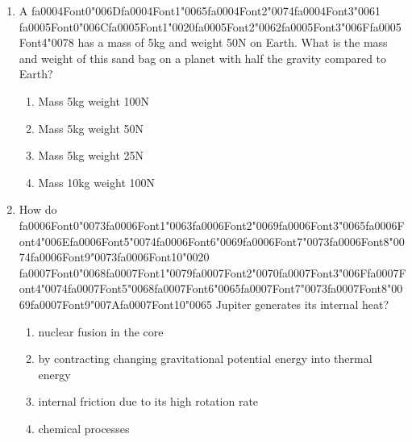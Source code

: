 \documentclass[12pt]{article}
\begin{document}
\begin{enumerate}[label=\arabic*.]
\begin{enumerate}[label=(\alph*)]
    \item Power emitted is 1/16 times as high; peak emission wavelength is 1/2 as long.
    \item Power emitted is 1/4 times as high; peak emission wavelength is 2 times longer.
    \item Power emitted is 1/4 times as high; peak emission wavelength is 1/2 as long.
    \item Power emitted is 1/16 times as high; peak emission wavelength is 2 times longer.
\end{enumerate}
\item A {\csname fa0004Font0\endcsname\char"006D}{\csname fa0004Font1\endcsname\char"0065}{\csname fa0004Font2\endcsname\char"0074}{\csname fa0004Font3\endcsname\char"0061} {\csname fa0005Font0\endcsname\char"006C}{\csname fa0005Font1\endcsname\char"0020}{\csname fa0005Font2\endcsname\char"0062}{\csname fa0005Font3\endcsname\char"006F}{\csname fa0005Font4\endcsname\char"0078} has a mass of 5kg and weight 50N on Earth. What is the mass and weight of this
sand bag on a planet with half the gravity compared to Earth?
\begin{enumerate}[label=(\alph*)]
    \item Mass 5kg weight 100N
    \item Mass 5kg weight 50N
    \item Mass 5kg weight 25N
    \item Mass 10kg weight 100N
\end{enumerate}
\item How do {\csname fa0006Font0\endcsname\char"0073}{\csname fa0006Font1\endcsname\char"0063}{\csname fa0006Font2\endcsname\char"0069}{\csname fa0006Font3\endcsname\char"0065}{\csname fa0006Font4\endcsname\char"006E}{\csname fa0006Font5\endcsname\char"0074}{\csname fa0006Font6\endcsname\char"0069}{\csname fa0006Font7\endcsname\char"0073}{\csname fa0006Font8\endcsname\char"0074}{\csname fa0006Font9\endcsname\char"0073}{\csname fa0006Font10\endcsname\char"0020} {\csname fa0007Font0\endcsname\char"0068}{\csname fa0007Font1\endcsname\char"0079}{\csname fa0007Font2\endcsname\char"0070}{\csname fa0007Font3\endcsname\char"006F}{\csname fa0007Font4\endcsname\char"0074}{\csname fa0007Font5\endcsname\char"0068}{\csname fa0007Font6\endcsname\char"0065}{\csname fa0007Font7\endcsname\char"0073}{\csname fa0007Font8\endcsname\char"0069}{\csname fa0007Font9\endcsname\char"007A}{\csname fa0007Font10\endcsname\char"0065} Jupiter generates its internal heat?
\begin{enumerate}[label=(\alph*)]
    \item nuclear fusion in the core
    \item by contracting changing gravitational potential energy into thermal energy
    \item internal friction due to its high rotation rate
    \item chemical processes
\end{enumerate}
\end{enumerate}
\end{document}
